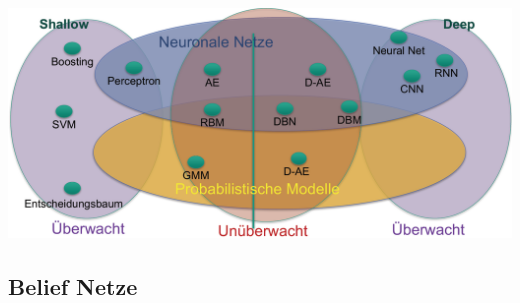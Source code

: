 \documentclass[paper=a4, fontsize=11pt]{scrartcl} %
\numberwithin{equation}{section} %
\numberwithin{figure}{section} %
\numberwithin{table}{section} %
\begin{document}
\includegraphics[width=\textwidth]{imgs/einteilung}

\subsection{Belief Netze}
\end{document}
